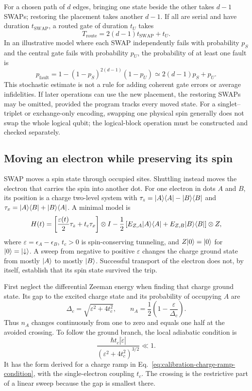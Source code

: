 For a chosen path of \(d\) edges, bringing one state beside
the other takes \(d-1\) SWAPs; restoring the placement takes
another \(d-1\). If all are serial and have duration
\(t_{\mathrm{SWAP}}\), a routed gate of duration \(t_U\) takes
\[
 T_{\mathrm{route}}=2(d-1)t_{\mathrm{SWAP}}+t_U.
\]
In an illustrative model where each SWAP independently fails
with probability \(p_S\) and the central gate fails with
probability \(p_U\), the probability of at least one fault is
\[
 p_{\mathrm{fault}}
 =1-(1-p_S)^{2(d-1)}(1-p_U)
 \simeq2(d-1)p_S+p_U.
\]
This stochastic estimate is not a rule for adding coherent
gate errors or average infidelities. If later operations can
use the new placement, the restoring SWAPs may be omitted,
provided the program tracks every moved state. For a
singlet--triplet or exchange-only encoding, swapping one
physical spin generally does not swap the whole logical
qubit; the logical-block operation must be constructed and
checked separately.

\subsection{Moving an electron while preserving its spin}
\label{sec:processor-shuttling}

SWAP moves a spin state through occupied sites. Shuttling instead
moves the electron that carries the spin into another dot. For one
electron in dots \(A\) and \(B\), its position is a charge
two-level system with
\(\tau_z=\lvert A\rangle\langle A\rvert-\lvert B\rangle\langle B\rvert\) and
\(\tau_x=\lvert A\rangle\langle B\rvert+\lvert B\rangle\langle A\rvert\). A minimal model is
\begin{equation}
 H(t)=
 \left[\frac{\varepsilon(t)}2\tau_z+t_c\tau_x\right]\otimes I
 -\frac12\left[E_{Z,A}\ket A\bra A+
              E_{Z,B}\ket B\bra B\right]\otimes Z,
 \label{eq:processor-shuttle-hamiltonian}
\end{equation}
where \(\varepsilon=\epsilon_A-\epsilon_B\), \(t_c>0\) is
spin-conserving tunneling, and \(Z\lvert 0\rangle=\lvert 0\rangle\) for
\(\lvert 0\rangle=\lvert \downarrow\rangle\). A sweep from negative to positive
\(\varepsilon\) changes the charge ground state from mostly
\(\lvert A\rangle\) to mostly \(\lvert B\rangle\). Successful transport of the
electron does not, by itself, establish that its spin state
survived the trip.

First neglect the differential Zeeman energy when finding that
charge ground state. Its gap to the excited charge state and its
probability of occupying \(A\) are
\[
 \Delta_c=\sqrt{\varepsilon^2+4t_c^2},\qquad
 n_A=\frac12\left(1-\frac{\varepsilon}{\Delta_c}\right).
\]
Thus \(n_A\) changes continuously from one to zero and equals
one half at the avoided crossing. To follow the ground branch,
the local adiabatic condition is
\begin{equation}
 \frac{\hbar t_c|\dot\varepsilon|}
      {(\varepsilon^2+4t_c^2)^{3/2}}\ll1.
 \label{eq:processor-shuttle-speed}
\end{equation}
It has the form derived for a charge ramp in
Eq.~\eqref{eq:calibration-charge-ramp-condition}, with the
single-electron coupling \(t_c\). The crossing is the
restrictive part of a linear sweep because the gap is smallest
there.

